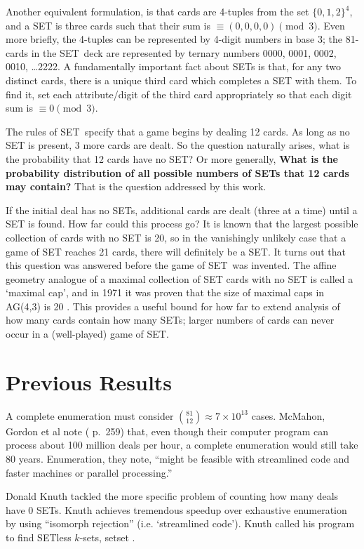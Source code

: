 \documentclass[10pt]{amsart}
\newcommand{\SETb}{SET\texttrademark\ } %
\newcommand{\SET}{SET\texttrademark}  %
\newcommand{\SETSET}{  {\sc setset} }
\begin{document}
Another equivalent formulation, is that cards are 4-tuples from the set
$\{0,1,2\}^4$, and a SET is three cards such that their sum is $\equiv (0,0,0,0)
\pmod 3$. Even more briefly, the 4-tuples can be represented by 4-digit numbers
in base 3; the 81-cards in the \SETb deck are represented by ternary numbers
0000, 0001, 0002, 0010, \ldots 2222. A fundamentally important fact about SETs
is that, for any two distinct cards, there is a unique third card which
completes a SET with them. To find it, set each attribute/digit of the third
card appropriately so that each digit sum is $\equiv 0 \pmod 3$.

The rules of \SETb specify that a game begins by dealing 12 cards. As long as no
SET is present, 3 more cards are dealt. So the question naturally arises, what
is the probability that 12 cards have no SET? Or more generally, {\bf What is
  the probability distribution of all possible numbers of SETs that 12 cards may
  contain?} That is the question addressed by this work.

If the initial deal has no SETs, additional cards are dealt (three at a time)
until a SET is found. How far could this process go? It is known that the
largest possible collection of cards with no SET is 20, so in the vanishingly
unlikely case that a game of SET reaches 21 cards, there will definitely be a
SET. It turns out that this question was answered before the game of \SETb was
invented. The affine geometry analogue of a maximal collection of SET cards with
no SET is called a `maximal cap', and in 1971 it was proven that the size of
maximal caps in AG(4,3) is 20 \cite{MAXCAP}. This provides a useful bound for
how far to extend analysis of how many cards contain how many SETs; larger
numbers of cards can never occur in a (well-played) game of \SET.

\section{Previous Results}
A complete enumeration must consider $\binom{81}{12} \approx 7\times 10^{13}$
cases. McMahon, Gordon et al note (\cite{JOS} p.~259) that, even though their
computer program can process about 100 million deals per hour, a complete
enumeration would still take 80 years. Enumeration, they note, ``might be
feasible with streamlined code and faster machines or parallel processing.''

Donald Knuth tackled the more specific problem of counting how many deals have 0
SETs. Knuth achieves tremendous speedup over exhaustive enumeration by using
``isomorph rejection'' (i.e. `streamlined code'). Knuth called his program to
find SETless $k$-sets, \SETSET \cite{SETSET}. 
\end{document}
